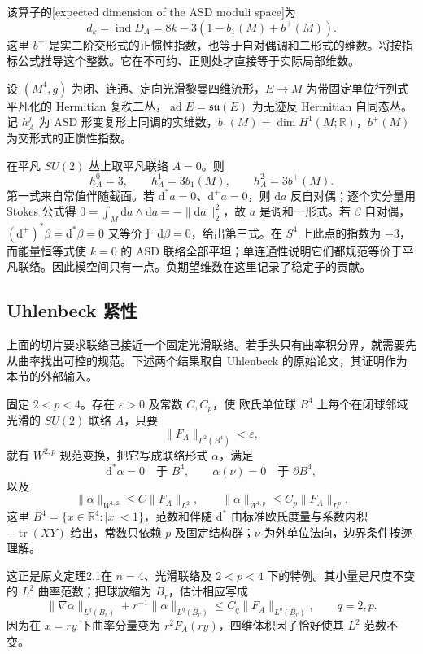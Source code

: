该算子的[expected dimension of the ASD moduli space]为
\begin{equation}\label{g3:eq:B-asd-expected-dimension}
 d_k=\operatorname{ind}D_A=8k-3(1-b_1(M)+b^+(M)).
\end{equation}
这里 \(b^+\) 是实二阶交形式的正惯性指数，也等于自对偶调和二形式的维数。将按指标公式推导这个整数。它在不可约、正则处才直接等于实际局部维数。

\begin{example}\label{g3:exm:B-flat-deformation}
	设 \((M^4,g)\) 为闭、连通、定向光滑黎曼四维流形，\(E\to M\) 为带固定单位行列式平凡化的 Hermitian 复秩二丛，\(\operatorname{ad}E=\mathfrak{su}(E)\) 为无迹反 Hermitian 自同态丛。
	记 \(h_A^j\) 为 ASD 形变复形上同调的实维数，\(b_1(M)=\dim H^1(M;\mathbb R)\)，\(b^+(M)\) 为交形式的正惯性指数。

 在平凡 \(SU(2)\) 丛上取平凡联络 \(A=0\)。则
 \[
  h_A^0=3,\qquad h_A^1=3b_1(M),\qquad h_A^2=3b^+(M).
 \]
 第一式来自常值伴随截面。若 \(\mathrm d^*a=0\)、\(\mathrm d^+a=0\)，则 \(\mathrm da\) 反自对偶；逐个实分量用 Stokes 公式得
 \(0=\int_M\mathrm da\wedge\mathrm da=-\|\mathrm da\|_2^2\)，故 \(a\) 是调和一形式。若 \(\beta\) 自对偶，\((\mathrm d^+)^*\beta=\mathrm d^*\beta=0\) 又等价于 \(\mathrm d\beta=0\)，给出第三式。在 \(S^4\) 上此点的指数为 \(-3\)，而能量恒等式使 \(k=0\) 的 ASD 联络全部平坦；单连通性说明它们都规范等价于平凡联络。因此模空间只有一点。负期望维数在这里记录了稳定子的贡献。
\end{example}

\subsection{Uhlenbeck 紧性}
\label{g3:subsec:B02:03}
上面的切片要求联络已接近一个固定光滑联络。若手头只有曲率积分界，就需要先从曲率找出可控的规范。下述两个结果取自 Uhlenbeck 的原始论文，其证明作为本节的外部输入。

\begin{theorem}\label{g3:thm:B-uhlenbeck-small-curvature}
 固定 \(2<p<4\)。存在 \(\varepsilon>0\) 及常数 \(C,C_p\)，使 欧氏单位球 \(B^4\) 上每个在闭球邻域光滑的 \(SU(2)\) 联络 \(A\)，只要
 \[
  \|F_A\|_{L^2(B^4)}<\varepsilon,
 \]
 就有 \(W^{2,p}\) 规范变换，把它写成联络形式 \(\alpha\)，满足
 \[
  \mathrm d^*\alpha=0\quad\text{于 }B^4,
  \qquad\alpha(\nu)=0\quad\text{于 }\partial B^4,
 \]
 以及
 \[
  \|\alpha\|_{W^{1,2}}\le C\|F_A\|_{L^2},
  \qquad \|\alpha\|_{W^{1,p}}\le C_p\|F_A\|_{L^p}.
 \]
 这里 \(B^4=\{x\in\mathbb R^4:|x|<1\}\)，范数和伴随 \(\mathrm d^*\) 由标准欧氏度量与系数内积 \(-\operatorname{tr}(XY)\) 给出，常数只依赖 \(p\) 及固定结构群；\(\nu\) 为外单位法向，边界条件按迹理解。
\end{theorem}
这正是原文定理2.1在 \(n=4\)、光滑联络及 \(2<p<4\) 下的特例\cite[定理2.1，第34页]{Uhlenbeck1982LpCurvature}。其小量是尺度不变的 \(L^2\) 曲率范数；把球放缩为 \(B_r\)，估计相应写成
\[
 \|\nabla\alpha\|_{L^q(B_r)}+r^{-1}\|\alpha\|_{L^q(B_r)}
 \le C_q\|F_A\|_{L^q(B_r)},\qquad q=2,p.
\]
因为在 \(x=ry\) 下曲率分量变为 \(r^2F_A(ry)\)，四维体积因子恰好使其 \(L^2\) 范数不变。

